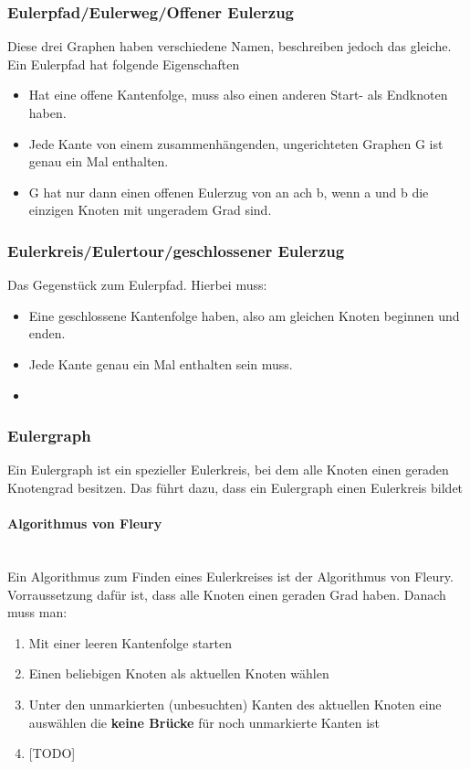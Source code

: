 \documentclass{article}
\newcommand{\paragraphlb}[1]{\paragraph{#1}\mbox{}\\}
\begin{document}
	\subsubsection{Eulerpfad/Eulerweg/Offener Eulerzug}
	Diese drei Graphen haben verschiedene Namen, beschreiben jedoch das gleiche. Ein Eulerpfad hat folgende Eigenschaften
	\begin{itemize}
		\item{Hat eine offene Kantenfolge, muss also einen anderen Start- als Endknoten haben.}
		\item{Jede Kante von einem zusammenhängenden, ungerichteten Graphen G ist genau ein Mal enthalten.}
		\item{G hat nur dann einen offenen Eulerzug von an ach b, wenn a und b die einzigen Knoten mit ungeradem Grad sind.}
	\end{itemize}
	\subsubsection{Eulerkreis/Eulertour/geschlossener Eulerzug}
	Das Gegenstück zum Eulerpfad. Hierbei muss:
	\begin{itemize}
		\item{Eine geschlossene Kantenfolge haben, also am gleichen Knoten beginnen und enden.}
		\item{Jede Kante genau ein Mal enthalten sein muss.}
		\item{}
	\end{itemize}
	\subsubsection{Eulergraph}
	Ein Eulergraph ist ein spezieller Eulerkreis, bei dem alle Knoten einen geraden Knotengrad besitzen. Das führt dazu, dass ein Eulergraph einen Eulerkreis bildet
	\paragraphlb{Algorithmus von Fleury}
	Ein Algorithmus zum Finden eines Eulerkreises ist der Algorithmus von Fleury. Vorraussetzung dafür ist, dass alle Knoten einen geraden Grad haben. Danach muss man:
	\begin{enumerate}
		\item{Mit einer leeren Kantenfolge starten}
		\item{Einen beliebigen Knoten als aktuellen Knoten wählen}
		\item{Unter den unmarkierten (unbesuchten) Kanten des aktuellen Knoten eine auswählen die \textbf{keine Brücke} für noch unmarkierte Kanten ist}
		\item{[TODO]}
	\end{enumerate}
\end{document}
